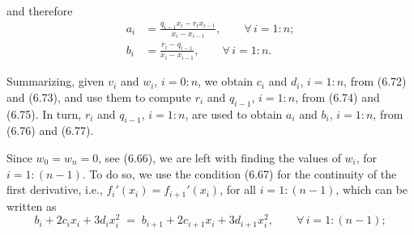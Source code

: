 
and therefore
\begin{align}
a_i &= \frac{q_{i-1}x_i - r_ix_{i-1}}{x_i-x_{i-1}}, \qquad \forall\, i = 1:n; \\
b_i &= \frac{r_i-q_{i-1}}{x_i-x_{i-1}}, \qquad \forall\, i = 1:n.
\end{align}

Summarizing, given $v_i$ and $w_i$, $i = 0:n$, we obtain $c_i$ and $d_i$, $i = 1:n$,
from (6.72) and (6.73), and use them to compute $r_i$ and $q_{i-1}$, $i = 1:n$, from
(6.74) and (6.75). In turn, $r_i$ and $q_{i-1}$, $i = 1:n$, are used to obtain $a_i$
and $b_i$, $i = 1:n$, from (6.76) and (6.77).

Since $w_0 = w_n = 0$, see (6.66), we are left with finding the values of $w_i$, for
$i = 1:(n-1)$. To do so, we use the condition (6.67) for the continuity of the first
derivative, i.e., $f_i'(x_i) = f_{i+1}'(x_i)$, for all $i = 1:(n-1)$, which can be
written as
\begin{equation}
b_i + 2c_ix_i + 3d_ix_i^2 \;=\; b_{i+1} + 2c_{i+1}x_i + 3d_{i+1}x_i^2, \qquad \forall\,
i = 1:(n-1);
\end{equation}

